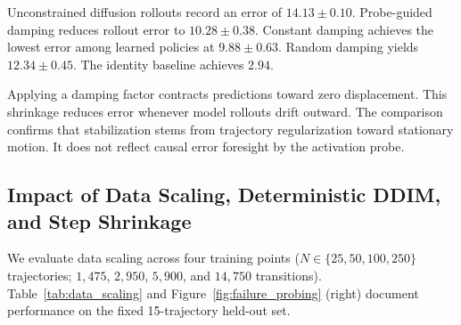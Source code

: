 \documentclass[11pt,a4paper]{article}
\begin{document}
Unconstrained diffusion rollouts record an error of $14.13 \pm 0.10$. Probe-guided damping reduces rollout error to $10.28 \pm 0.38$. Constant damping achieves the lowest error among learned policies at $9.88 \pm 0.63$. Random damping yields $12.34 \pm 0.45$. The identity baseline achieves $2.94$.

Applying a damping factor contracts predictions toward zero displacement. This shrinkage reduces error whenever model rollouts drift outward. The comparison confirms that stabilization stems from trajectory regularization toward stationary motion. It does not reflect causal error foresight by the activation probe.

\subsection{Impact of Data Scaling, Deterministic DDIM, and Step Shrinkage}
We evaluate data scaling across four training points ($N \in \{25, 50, 100, 250\}$ trajectories; $1,475$, $2,950$, $5,900$, and $14,750$ transitions). Table~\ref{tab:data_scaling} and Figure~\ref{fig:failure_probing} (right) document performance on the fixed 15-trajectory held-out set.
\end{document}
